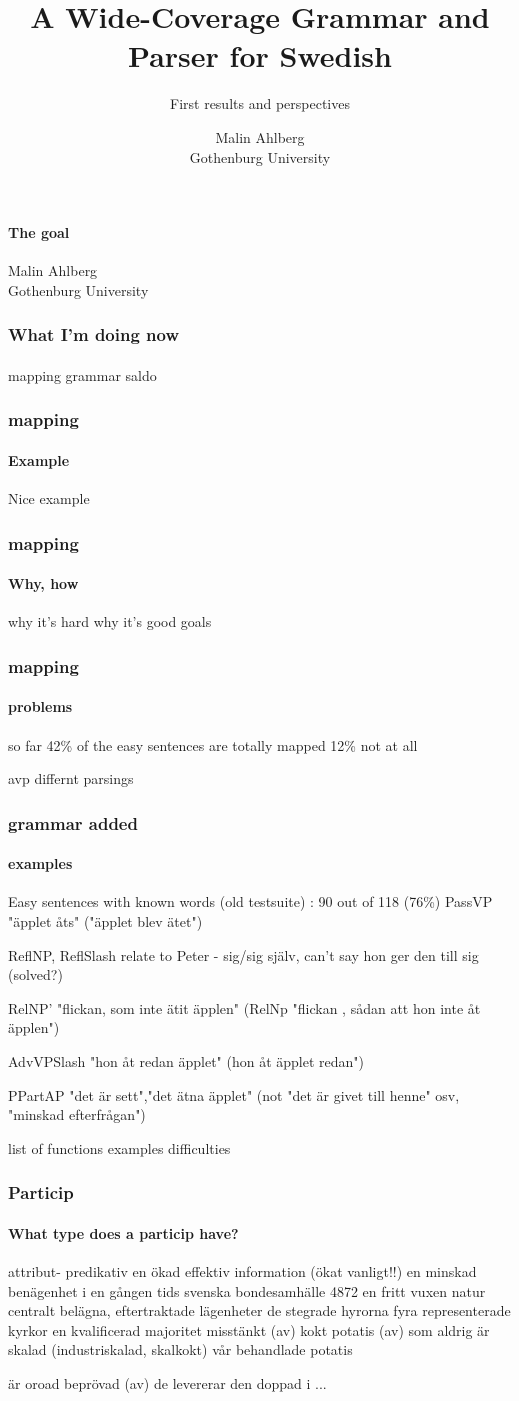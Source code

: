 \documentclass[10pt]{beamer}
\title{A Wide-Coverage Grammar and Parser for Swedish}
\subtitle{\large First results and perspectives}
\author{Malin Ahlberg \\ Gothenburg University}
\date{}
\begin{document}
\maketitle

\begin{frame}
    \framesubtitle{The goal}
    Malin Ahlberg \\
 \pause 
    Gothenburg University
\end{frame}

\begin{frame}
\frametitle{What I'm doing now}
\framesubtitle{} 
mapping
grammar 
saldo
\end{frame}

\begin{frame}
\frametitle{mapping}
\framesubtitle{Example} 
Nice example
\end{frame}


\begin{frame}
\frametitle{mapping}
\framesubtitle{Why, how} 
why it's hard
why it's good
goals
\end{frame}

\begin{frame}
\frametitle{mapping}
\framesubtitle{problems} 
so far 42\% of the easy sentences are totally mapped 
       12\% not at all

avp
differnt parsings
\end{frame}

\begin{frame}
\frametitle{grammar added}
\framesubtitle{examples} 
Easy sentences with known words (old testsuite) : 90 out of 118 (76\%) 
PassVP "äpplet åts"
  ("äpplet blev ätet")


ReflNP, ReflSlash
  relate to Peter - sig/sig själv, can't say hon ger den till sig
  (solved?)

RelNP' "flickan, som inte ätit äpplen"
 (RelNp "flickan , sådan att hon inte åt äpplen")

AdvVPSlash "hon åt redan äpplet" (hon åt äpplet redan")

PPartAP "det är sett","det ätna äpplet"
 (not "det är givet till henne" osv, "minskad efterfrågan")
  

list of functions
examples
difficulties
\end{frame}



\begin{frame}
\frametitle{Particip}
\framesubtitle{What type does a particip have?} 
attribut- predikativ
en ökad effektiv information (ökat vanligt!!)
en minskad benägenhet
i en gången tids svenska bondesamhälle  4872    
en fritt vuxen natur
centralt belägna, eftertraktade lägenheter
de stegrade hyrorna
fyra representerade kyrkor
en kvalificerad majoritet
misstänkt (av)
kokt potatis (av)
som aldrig är skalad (industriskalad, skalkokt)
vår behandlade potatis

är oroad
beprövad (av)
de levererar den doppad i ...
\end{frame}
\end{document}
